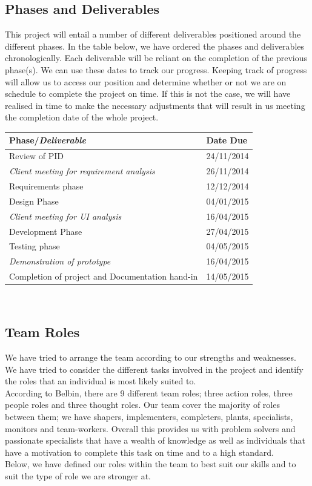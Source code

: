 \subsection{Phases and Deliverables}
This project will entail a number of different deliverables positioned around the different phases.  In the table below, we have ordered the phases and deliverables chronologically.  Each deliverable will be reliant on the completion of the previous phase(s).  We can use these dates to track our progress.  Keeping track of progress will allow us to access our position and determine whether or not we are on schedule to complete the project on time.  If this is not the case, we will have realised in time to make the necessary adjustments that will result in us meeting the completion date of the whole project.  \\

\noindent
\begin{tabular}{|l || p{6cm}|}
\hline
\textbf{Phase/\emph{Deliverable}} & \textbf{Date Due} \\ \hline
Review of PID & 24/11/2014 \\ \hline
\emph{Client meeting for requirement analysis} & 26/11/2014 \\ \hline
Requirements phase & 12/12/2014 \\ \hline
Design Phase & 04/01/2015 \\ \hline
\emph{Client meeting for UI analysis} & 16/04/2015 \\ \hline
Development Phase & 27/04/2015 \\ \hline
Testing phase & 04/05/2015 \\ \hline
\emph{Demonstration of prototype} & 16/04/2015 \\ \hline
Completion of project and Documentation hand-in & 14/05/2015 \\ \hline
\end{tabular}\\
\vspace{0.5cm}

\subsection{Team Roles}
We have tried to arrange the team according to our strengths and weaknesses.  We have tried to consider the different tasks involved in the project and identify the roles that an individual is most likely suited to.  \\
According to Belbin, there are 9 different team roles; three action roles, three people roles and three thought roles.  Our team cover the majority of roles between them; we have shapers, implementers, completers, plants, specialists, monitors and team-workers.  Overall this provides us with problem solvers and passionate specialists that have a wealth of knowledge as well as individuals that have a  motivation to complete this task on time and to a high standard. \\
Below, we have defined our roles within the team to best suit our skills and to suit the type of role we are stronger at.

